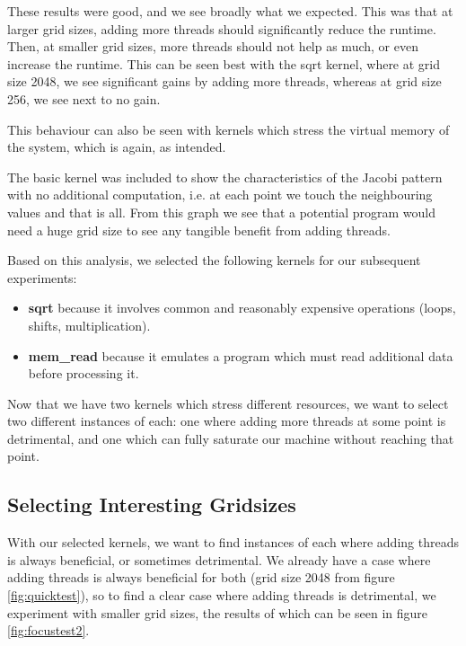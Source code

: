 These results were good, and we see broadly what we expected. This was that at larger grid sizes, adding more threads should significantly reduce the runtime. Then, at smaller grid sizes, more threads should not help as much, or even increase the runtime. This can be seen best with the sqrt kernel, where at grid size 2048, we see significant gains by adding more threads, whereas at grid size 256, we see next to no gain.

This behaviour can also be seen with kernels which stress the virtual memory of the system, which is again, as intended.

The basic kernel was included to show the characteristics of the Jacobi pattern with no additional computation, i.e. at each point we touch the neighbouring values and that is all. From this graph we see that a potential program would need a huge grid size to see any tangible benefit from adding threads.

Based on this analysis, we selected the following kernels for our subsequent experiments:

\begin{itemize}
    \item \textbf{sqrt} because it involves common and reasonably expensive operations (loops, shifts, multiplication).
    \item \textbf{mem\_read} because it emulates a program which must read additional data before processing it.
\end{itemize}

Now that we have two kernels which stress different resources, we want to select two different instances of each: one where adding more threads at some point is detrimental, and one which can fully saturate our machine without reaching that point.



\subsection{Selecting Interesting Gridsizes}
\label{section:results:selecting_interesting_gridsizes}

With our selected kernels, we want to find instances of each where adding threads is always beneficial, or sometimes detrimental. We already have a case where adding threads is always beneficial for both (grid size 2048 from figure \ref{fig:quicktest}), so to find a clear case where adding threads is detrimental, we experiment with smaller grid sizes, the results of which can be seen in figure \ref{fig:focustest2}.



